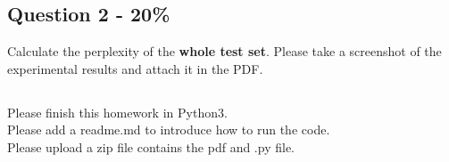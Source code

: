 \documentclass{article}
\begin{document}
\subsection*{Question 2 - 20\%}
Calculate the perplexity of the \textbf{whole test set}. 
Please take a screenshot of the experimental results and attach it in the PDF.

\subsection*{}

{\color{red}Please finish this homework in Python3.}\\
{\color{red}Please add a readme.md to introduce how to run the code.}\\
{\color{red}Please upload a zip file contains the pdf and .py file.}
\end{document}
